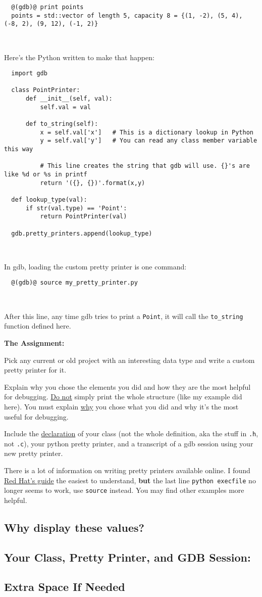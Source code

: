\documentclass{article}
\begin{document}
\begin{lstlisting}
  @(gdb)@ print points
  points = std::vector of length 5, capacity 8 = {(1, -2), (5, 4), (-8, 2), (9, 12), (-1, 2)}
\end{lstlisting}
~

Here's the Python written to make that happen:
\begin{lstlisting}
  import gdb

  class PointPrinter:
      def __init__(self, val):
          self.val = val

      def to_string(self):
          x = self.val['x']   # This is a dictionary lookup in Python
          y = self.val['y']   # You can read any class member variable this way

          # This line creates the string that gdb will use. {}'s are like %d or %s in printf
          return '({}, {})'.format(x,y)

  def lookup_type(val):
      if str(val.type) == 'Point':
          return PointPrinter(val)

  gdb.pretty_printers.append(lookup_type)
\end{lstlisting}
~

In gdb, loading the custom pretty printer is one command:
\begin{lstlisting}
  @(gdb)@ source my_pretty_printer.py
\end{lstlisting}
~

After this line, any time gdb tries to print a \texttt{Point}, it will call
the \texttt{to\_string} function defined here.

\bigskip

\textbf{The Assignment:}

Pick any current or old project with an interesting data type and write a
custom pretty printer for it.

Explain why you chose the elements you did and how they are the most helpful
for debugging. \ul{Do not} simply print the whole structure (like my example
did here). You must explain \ul{why} you chose what you did and why it's the
most useful for debugging.

Include the \ul{declaration} of your class (not the whole definition, aka the
stuff in \texttt{.h}, not \texttt{.c}), your python pretty printer, and a
transcript of a gdb session using your new pretty printer.

There is a lot of information on writing pretty printers available online.
I found
\href{https://access.redhat.com/documentation/en-US/Red_Hat_Enterprise_Linux/6/html/Developer_Guide/debuggingprettyprinters.html}
{Red Hat's guide} the easiest to understand, \textbf{but} the last line
\texttt{python execfile} no longer seems to work, use \texttt{source} instead.
You may find other examples more helpful.

\newpage
\subsection*{Why display these values?}
\vspace{3cm}

\subsection*{Your Class, Pretty Printer, and GDB Session:}

\newpage
\subsection*{Extra Space If Needed}
\end{document}
